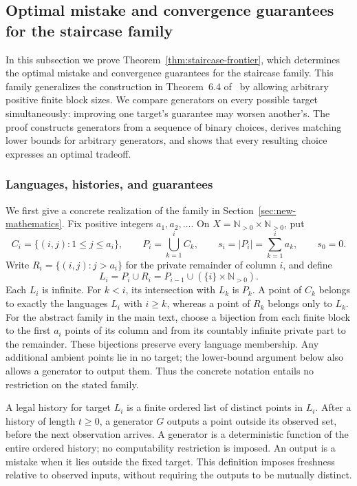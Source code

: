 \subsection{Optimal mistake and convergence guarantees for the staircase family}
\label{app:p29-frontier}

In this subsection we prove Theorem~\ref{thm:staircase-frontier}, which
determines the optimal mistake and convergence guarantees for the staircase
family. This family generalizes the construction in Theorem~6.4
of~\citet[][P29]{mistake} by allowing arbitrary positive finite block sizes.
We compare generators on every possible target simultaneously: improving
one target's guarantee may worsen another's. The proof constructs generators
from a sequence of binary choices, derives matching lower bounds for
arbitrary generators, and shows that every resulting choice expresses an
optimal tradeoff.

\subsubsection{Languages, histories, and guarantees}
\label{app:p29-frontier-setup}
We first give a concrete realization of the family in
Section~\ref{sec:new-mathematics}. Fix positive integers $a_1,a_2,\ldots$. On
$X=\mathbb N_{>0}\times\mathbb N_{>0}$, put
\[
 C_i=\{(i,j):1\le j\le a_i\},\qquad
 P_i=\bigcup_{k=1}^{i}C_k,\qquad
 s_i=|P_i|=\sum_{k=1}^{i}a_k,
 \qquad s_0=0.
\]
Write $R_i=\{(i,j):j>a_i\}$ for the private remainder of column $i$,
and define
\[
 L_i=P_i\cup R_i
     =P_{i-1}\cup(\{i\}\times\mathbb N_{>0}).
\]
Each $L_i$ is infinite. For $k<i$, its intersection with $L_k$ is
$P_k$. A point of $C_k$ belongs to exactly the languages $L_i$ with
$i\ge k$, whereas a point of $R_k$ belongs only to $L_k$.
For the abstract family in the main text, choose a bijection from each
finite block to the first $a_i$ points of its column and from its countably
infinite private part to the remainder. These bijections preserve every
language membership. Any additional ambient points lie in no target;
the lower-bound argument below also allows a generator to output them.
Thus the concrete notation entails no restriction on the stated family.

A legal history for target $L_i$ is a finite ordered list of distinct
points in $L_i$. After a history of length $t\ge0$, a generator $G$
outputs a point outside its observed set, before the next observation
arrives. A generator is a deterministic function of the entire ordered
history; no computability restriction is imposed. An output is
a mistake when it lies outside the fixed target. This definition imposes
freshness relative to observed inputs, without requiring the outputs to
be mutually distinct.

